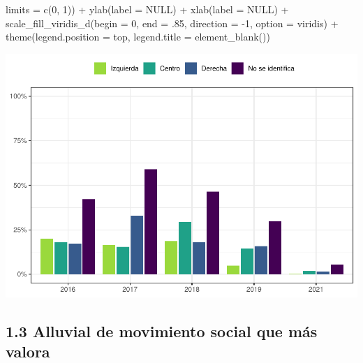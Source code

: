 \documentclass[
  12pt,
]{book}
\newenvironment{Shaded}{\begin{snugshade}}{\end{snugshade}}
\newcommand{\AttributeTok}[1]{\textcolor[rgb]{0.77,0.63,0.00}{#1}}
\newcommand{\ConstantTok}[1]{\textcolor[rgb]{0.00,0.00,0.00}{#1}}
\newcommand{\DecValTok}[1]{\textcolor[rgb]{0.00,0.00,0.81}{#1}}
\newcommand{\FunctionTok}[1]{\textcolor[rgb]{0.00,0.00,0.00}{#1}}
\newcommand{\NormalTok}[1]{#1}
\newcommand{\SpecialCharTok}[1]{\textcolor[rgb]{0.00,0.00,0.00}{#1}}
\newcommand{\StringTok}[1]{\textcolor[rgb]{0.31,0.60,0.02}{#1}}
\begin{document}
\begin{Shaded}
\begin{Highlighting}[]
                       \AttributeTok{limits =} \FunctionTok{c}\NormalTok{(}\DecValTok{0}\NormalTok{, }\DecValTok{1}\NormalTok{)) }\SpecialCharTok{+}
    \FunctionTok{ylab}\NormalTok{(}\AttributeTok{label =} \ConstantTok{NULL}\NormalTok{) }\SpecialCharTok{+}
    \FunctionTok{xlab}\NormalTok{(}\AttributeTok{label =} \ConstantTok{NULL}\NormalTok{) }\SpecialCharTok{+}
    \FunctionTok{scale\_fill\_viridis\_d}\NormalTok{(}\AttributeTok{begin =} \DecValTok{0}\NormalTok{, }\AttributeTok{end =}\NormalTok{ .}\DecValTok{85}\NormalTok{, }\AttributeTok{direction =} \SpecialCharTok{{-}}\DecValTok{1}\NormalTok{, }\AttributeTok{option =} \StringTok{\textquotesingle{}viridis\textquotesingle{}}\NormalTok{) }\SpecialCharTok{+}
    \FunctionTok{theme}\NormalTok{(}\AttributeTok{legend.position =} \StringTok{\textquotesingle{}top\textquotesingle{}}\NormalTok{,}
          \AttributeTok{legend.title =} \FunctionTok{element\_blank}\NormalTok{()) }
\end{Highlighting}
\end{Shaded}

\includegraphics{reporte-elsoc_files/figure-latex/unnamed-chunk-7-1.pdf}

\hypertarget{alluvial-de-movimiento-social-que-muxe1s-valora}{%
\subsection{1.3 Alluvial de movimiento social que más valora}\label{alluvial-de-movimiento-social-que-muxe1s-valora}}
\end{document}
